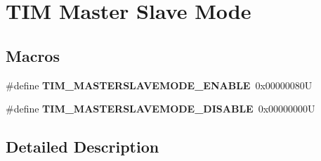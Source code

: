 \hypertarget{group___t_i_m___master___slave___mode}{}\section{T\+IM Master Slave Mode}
\label{group___t_i_m___master___slave___mode}
\subsection*{Macros}
\begin{DoxyCompactItemize}
\item 
\mbox{\label{group___t_i_m___master___slave___mode_gafdc0de07db4688aa8c87cf03220aaf28}} 
\#define {\bfseries T\+I\+M\+\_\+\+M\+A\+S\+T\+E\+R\+S\+L\+A\+V\+E\+M\+O\+D\+E\+\_\+\+E\+N\+A\+B\+LE}~0x00000080U
\item 
\mbox{\label{group___t_i_m___master___slave___mode_ga58ff99ef1d6d6f187e3615f9d3ec3b8b}} 
\#define {\bfseries T\+I\+M\+\_\+\+M\+A\+S\+T\+E\+R\+S\+L\+A\+V\+E\+M\+O\+D\+E\+\_\+\+D\+I\+S\+A\+B\+LE}~0x00000000U
\end{DoxyCompactItemize}


\subsection{Detailed Description}
